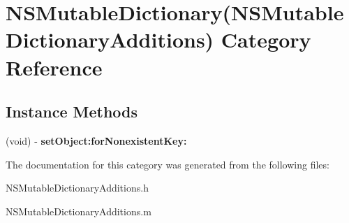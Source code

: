 \hypertarget{category_n_s_mutable_dictionary_07_n_s_mutable_dictionary_additions_08}{}\section{N\+S\+Mutable\+Dictionary(N\+S\+Mutable\+Dictionary\+Additions) Category Reference}
\label{category_n_s_mutable_dictionary_07_n_s_mutable_dictionary_additions_08}
\subsection*{Instance Methods}
\begin{DoxyCompactItemize}
\item 
\mbox{\label{category_n_s_mutable_dictionary_07_n_s_mutable_dictionary_additions_08_a506e8a971c16ae7740ab0c78c34e283c}} 
(void) -\/ {\bfseries set\+Object\+:for\+Nonexistent\+Key\+:}
\end{DoxyCompactItemize}


The documentation for this category was generated from the following files\+:\begin{DoxyCompactItemize}
\item 
N\+S\+Mutable\+Dictionary\+Additions.\+h\item 
N\+S\+Mutable\+Dictionary\+Additions.\+m\end{DoxyCompactItemize}
